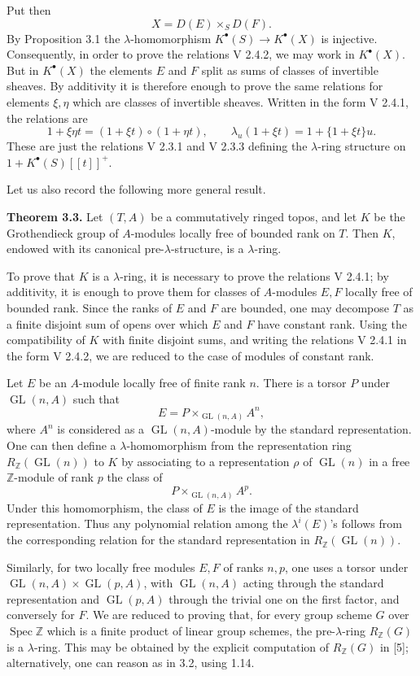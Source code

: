 \documentclass[11pt]{article}
\newcommand{\Spec}{\operatorname{Spec}}
\providecommand{\GL}{\operatorname{GL}}
\begin{document}
Put then
\[
  X=D(E)\times_S D(F).
\]
By Proposition 3.1 the \(\lambda\)-homomorphism \(K^\bullet(S)\to K^\bullet(X)\) is injective. Consequently, in order to prove the relations V 2.4.2, we may work in \(K^\bullet(X)\). But in \(K^\bullet(X)\) the elements \(E\) and \(F\) split as sums of classes of invertible sheaves. By additivity it is therefore enough to prove the same relations for elements \(\xi,\eta\) which are classes of invertible sheaves. Written in the form V 2.4.1, the relations are
\[
  1+\xi\eta t=(1+\xi t)\circ(1+\eta t),
  \qquad
  \lambda_u(1+\xi t)=1+\{1+\xi t\}u.
\]
These are just the relations V 2.3.1 and V 2.3.3 defining the \(\lambda\)-ring structure on \(1+K^\bullet(S)[[t]]^+\).

Let us also record the following more general result.

\textbf{Theorem 3.3.} Let \((T,A)\) be a commutatively ringed topos, and let \(K\) be the Grothendieck group of \(A\)-modules locally free of bounded rank on \(T\). Then \(K\), endowed with its canonical pre-\(\lambda\)-structure, is a \(\lambda\)-ring.

To prove that \(K\) is a \(\lambda\)-ring, it is necessary to prove the relations V 2.4.1; by additivity, it is enough to prove them for classes of \(A\)-modules \(E,F\) locally free of bounded rank. Since the ranks of \(E\) and \(F\) are bounded, one may decompose \(T\) as a finite disjoint sum of opens over which \(E\) and \(F\) have constant rank. Using the compatibility of \(K\) with finite disjoint sums, and writing the relations V 2.4.1 in the form V 2.4.2, we are reduced to the case of modules of constant rank.

Let \(E\) be an \(A\)-module locally free of finite rank \(n\). There is a torsor \(P\) under \(\GL(n,A)\) such that
\[
  E=P\times_{\GL(n,A)} A^n,
\]
where \(A^n\) is considered as a \(\GL(n,A)\)-module by the standard representation. One can then define a \(\lambda\)-homomorphism from the representation ring \(R_{\mathbb Z}(\GL(n))\) to \(K\) by associating to a representation \(\rho\) of \(\GL(n)\) in a free \(\mathbb Z\)-module of rank \(p\) the class of
\[
  P\times_{\GL(n,A)} A^p.
\]
Under this homomorphism, the class of \(E\) is the image of the standard representation. Thus any polynomial relation among the \(\lambda^i(E)\)'s follows from the corresponding relation for the standard representation in \(R_{\mathbb Z}(\GL(n))\).

Similarly, for two locally free modules \(E,F\) of ranks \(n,p\), one uses a torsor under \(\GL(n,A)\times\GL(p,A)\), with \(\GL(n,A)\) acting through the standard representation and \(\GL(p,A)\) through the trivial one on the first factor, and conversely for \(F\). We are reduced to proving that, for every group scheme \(G\) over \(\Spec\mathbb Z\) which is a finite product of linear group schemes, the pre-\(\lambda\)-ring \(R_{\mathbb Z}(G)\) is a \(\lambda\)-ring. This may be obtained by the explicit computation of \(R_{\mathbb Z}(G)\) in [5]; alternatively, one can reason as in 3.2, using 1.14.
\end{document}
